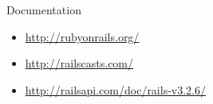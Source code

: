 \documentclass[12pt]{beamer}
\begin{document}

\begin{frame}
	\begin{block}{Documentation}
	\begin{itemize}
	  \item \url{http://rubyonrails.org/}
	  \item \url{http://railscasts.com/}
	  \item \url{http://railsapi.com/doc/rails-v3.2.6/}
	\end{itemize}
	\end{block}
\end{frame}
\end{document}

